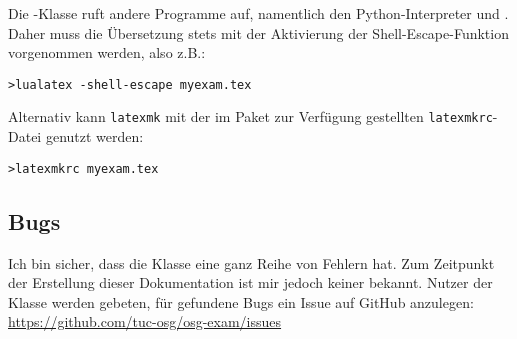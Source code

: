 \documentclass[
load=osgexam,
babel=ngerman
]{skdoc}
\begin{document}
Die \thepkg-Klasse ruft andere Programme auf, namentlich den Python-Interpreter und .
Daher muss die Übersetzung stets mit der Aktivierung der Shell-Escape-Funktion vorgenommen werden, also z.B.:\medskip

\noindent\verb!>lualatex -shell-escape myexam.tex!

\medskip
Alternativ kann \texttt{latexmk} mit der im Paket zur Verfügung gestellten \texttt{latexmkrc}-Datei genutzt werden:
\medskip

\noindent\verb!>latexmkrc myexam.tex!

\medskip
{}


\subsection{Bugs}
Ich bin sicher, dass die Klasse eine ganz Reihe von Fehlern hat. Zum Zeitpunkt der Erstellung dieser Dokumentation ist
mir jedoch keiner bekannt. Nutzer der Klasse werden gebeten, für gefundene Bugs ein Issue auf GitHub anzulegen:
\url{https://github.com/tuc-osg/osg-exam/issues} 
\end{document}
